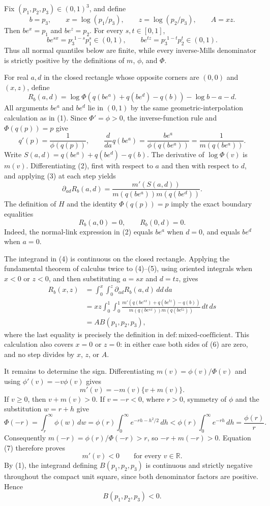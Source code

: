 Fix \((p_1,p_2,p_3)\in(0,1)^3\), and define
\[
b=p_3,\qquad x=\log(p_1/p_3),\qquad z=\log(p_2/p_3),\qquad A=xz.
\]
Then \(be^x=p_1\) and \(be^z=p_2\).  For every \(s,t\in[0,1]\),
\[
be^{sx}=p_3^{,1-s}p_1^s\in(0,1),
\qquad
be^{tz}=p_3^{,1-t}p_2^t\in(0,1).
\tag{1}
\]
Thus all normal quantiles below are finite, while every inverse-Mills denominator is strictly positive by the definitions of \(m\), \(\phi\), and \(\Phi\).

For real \(a,d\) in the closed rectangle whose opposite corners are \((0,0)\) and \((x,z)\), define
\[
R_b(a,d)
=\log\Phi\!\left(q(be^a)+q(be^d)-q(b)\right)-\log b-a-d.
\tag{2}
\]
All arguments \(be^a\) and \(be^d\) lie in \((0,1)\) by the same geometric-interpolation calculation as in (1).  Since \(\Phi'=\phi>0\), the inverse-function rule and \(\Phi(q(p))=p\) give
\[
q'(p)=\frac{1}{\phi(q(p))},
\qquad
\frac{d}{da}q(be^a)
=\frac{be^a}{\phi(q(be^a))}
=\frac{1}{m(q(be^a))}.
\tag{3}
\]
Write \(S(a,d)=q(be^a)+q(be^d)-q(b)\).  The derivative of \(\log\Phi(v)\) is \(m(v)\).  Differentiating (2), first with respect to \(a\) and then with respect to \(d\), and applying (3) at each step yields
\[
\partial_{ad}R_b(a,d)
=\frac{m'(S(a,d))}
{m(q(be^a))m(q(be^d))}.
\tag{4}
\]
The definition of \(H\) and the identity \(\Phi(q(p))=p\) imply the exact boundary equalities
\[
R_b(a,0)=0,
\qquad
R_b(0,d)=0.
\tag{5}
\]
Indeed, the normal-link expression in (2) equals \(be^a\) when \(d=0\), and equals \(be^d\) when \(a=0\).

The integrand in (4) is continuous on the closed rectangle.  Applying the fundamental theorem of calculus twice to (4)--(5), using oriented integrals when \(x<0\) or \(z<0\), and then substituting \(a=sx\) and \(d=tz\), gives
\[
\begin{aligned}
R_b(x,z)
&=\int_0^x\!\int_0^z \partial_{ad}R_b(a,d)\,dd\,da\\
&=xz\int_0^1\!\int_0^1
\frac{m'\!\left(q(be^{sx})+q(be^{tz})-q(b)\right)}
{m(q(be^{sx}))m(q(be^{tz}))}\,dt\,ds\\
&=A B(p_1,p_2,p_3),
\end{aligned}
\tag{6}
\]
where the last equality is precisely the definition in \(\mathrm{def{:}mixed\text{-}coefficient}\).  This calculation also covers \(x=0\) or \(z=0\): in either case both sides of (6) are zero, and no step divides by \(x\), \(z\), or \(A\).

It remains to determine the sign.  Differentiating \(m(v)=\phi(v)/\Phi(v)\) and using \(\phi'(v)=-v\phi(v)\) gives
\[
m'(v)=-m(v)\{v+m(v)\}.
\tag{7}
\]
If \(v\geq0\), then \(v+m(v)>0\).  If \(v=-r<0\), where \(r>0\), symmetry of \(\phi\) and the substitution \(w=r+h\) give
\[
\Phi(-r)
=\int_r^\infty\phi(w)\,dw
=\phi(r)\int_0^\infty e^{-rh-h^2/2}\,dh
<\phi(r)\int_0^\infty e^{-rh}\,dh
=\frac{\phi(r)}{r}.
\tag{8}
\]
Consequently \(m(-r)=\phi(r)/\Phi(-r)>r\), so \(-r+m(-r)>0\).  Equation (7) therefore proves
\[
m'(v)<0\qquad\text{for every }v\in\mathbb R.
\tag{9}
\]
By (1), the integrand defining \(B(p_1,p_2,p_3)\) is continuous and strictly negative throughout the compact unit square, since both denominator factors are positive.  Hence
\[
B(p_1,p_2,p_3)<0.
\tag{10}
\]

